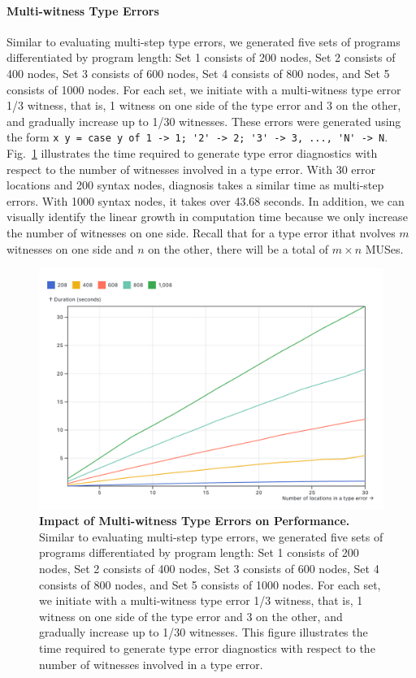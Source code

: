\documentclass[pdflatex,lineno,sn-nature,Numbered]{sn-jnl}%
\begin{document}
\paragraph{Multi-witness Type Errors}

Similar to evaluating multi-step type errors, we generated five sets of programs differentiated by program length: Set 1 consists of 200 nodes, Set 2 consists of 400 nodes, Set 3 consists of 600 nodes, Set 4 consists of 800 nodes, and Set 5 consists of 1000 nodes. For each set, we initiate with a multi-witness type error 1/3 witness, that is, 1 witness on one side of the type error and 3 on the other, and gradually increase up to 1/30 witnesses. These errors were generated using the form \lstinline{x y = case y of 1 -> 1; '2' -> 2; '3' -> 3, ..., 'N' -> N}. Fig.~\ref{fig:multi-witness-time} illustrates the time required to generate type error diagnostics with respect to the number of witnesses involved in a type error. With 30 error locations and 200 syntax nodes, diagnosis takes a similar time as multi-step errors. With 1000 syntax nodes, it takes over 43.68 seconds. In addition, we can visually identify the linear growth in computation time because we only increase the number of witnesses on one side. Recall that for a type error ithat nvolves $m$ witnesses on one side and $n$ on the other, there will be a total of $m \times n$ MUSes.

\begin{figure}[ht]
    \centering
    \includegraphics[width=0.8\linewidth]{images/multi-witness-time.png}
    \caption{{\bf Impact of Multi-witness Type Errors on Performance.} Similar to evaluating multi-step type errors, we generated five sets of programs differentiated by program length: Set 1 consists of 200 nodes, Set 2 consists of 400 nodes, Set 3 consists of 600 nodes, Set 4 consists of 800 nodes, and Set 5 consists of 1000 nodes. For each set, we initiate with a multi-witness type error 1/3 witness, that is, 1 witness on one side of the type error and 3 on the other, and gradually increase up to 1/30 witnesses. This figure illustrates the time required to generate type error diagnostics with respect to the number of witnesses involved in a type error.}
    \label{fig:multi-witness-time}
\end{figure}
\end{document}
